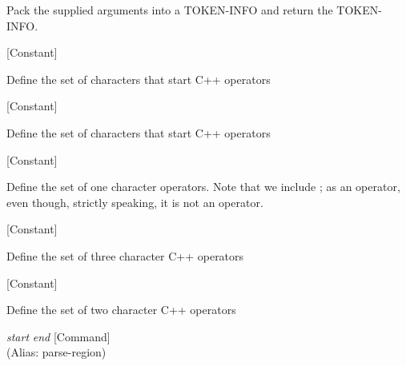 \begin{doc-string}
Pack the supplied arguments into a TOKEN-INFO and return the TOKEN-INFO.
\end{doc-string}

\vspace{1em}
\noindent
{}
\usebox{\funcname}
 \hfill [Constant]

\begin{doc-string}
Define the set of characters that start C++ operators
\end{doc-string}

\vspace{1em}
\noindent
{}
\usebox{\funcname}
 \hfill [Constant]

\begin{doc-string}
Define the set of characters that start C++ operators
\end{doc-string}

\vspace{1em}
\noindent
{}
\usebox{\funcname}
 \hfill [Constant]

\begin{doc-string}
Define the set of one character operators.  Note that we include ; as
an operator, even though, strictly speaking, it is not an operator.
\end{doc-string}

\vspace{1em}
\noindent
{}
\usebox{\funcname}
 \hfill [Constant]

\begin{doc-string}
Define the set of three character C++ operators
\end{doc-string}

\vspace{1em}
\noindent
{}
\usebox{\funcname}
 \hfill [Constant]

\begin{doc-string}
Define the set of two character C++ operators
\end{doc-string}

\vspace{1em}
\noindent
{}
\usebox{\funcname}\emph{start} \emph{end}
 \hfill [Command]\\%
 (Alias: parse-region)


